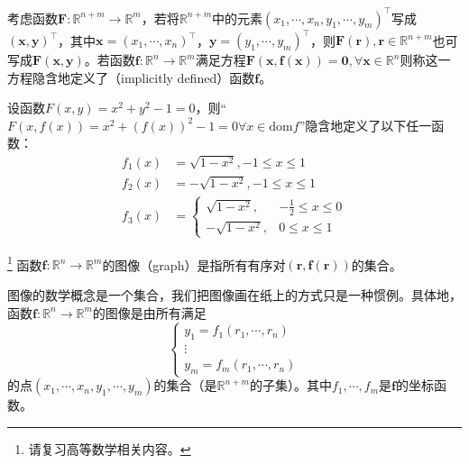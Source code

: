 \documentclass[main.tex]{subfiles}
\begin{document}
\begin{definition}[隐函数]
考虑函数$\mathbf{F}:\mathbb{R}^{n+m}\rightarrow\mathbb{R}^m$，若将$\mathbb{R}^{n+m}$中的元素$\left(x_1,\cdots,x_n,y_1,\cdots,y_m\right)^\intercal$写成$\left(\mathbf{x},\mathbf{y}\right)^\intercal$，其中$\mathbf{x}=\left(x_1,\cdots,x_n\right)^\intercal$，$\mathbf{y}=\left(y_1,\cdots,y_m\right)^\intercal$，则$\mathbf{F}\left(\mathbf{r}\right),\mathbf{r}\in\mathbb{R}^{n+m}$也可写成$\mathbf{F}\left(\mathbf{x},\mathbf{y}\right)$。若函数$\mathbf{f}:\mathbb{R}^n\rightarrow\mathbb{R}^m$满足方程$\mathbf{F}\left(\mathbf{x},\mathbf{f}\left(\mathbf{x}\right)\right)=\mathbf{0},\forall\mathbf{x}\in\mathbb{R}^n$则称这一方程隐含地定义了（implicitly defined）函数$\mathbf{f}$。
\end{definition}

\begin{example}
设函数$F\left(x,y\right)=x^2+y^2-1=0$，则“$F\left(x,f\left(x\right)\right)=x^2+\left(f\left(x\right)\right)^2-1=0\forall x\in\mathrm{dom}f$”隐含地定义了以下任一函数：
\begin{align*}
    f_1\left(x\right)&=\sqrt{1-x^2},-1\leq x\leq 1\\
    f_2\left(x\right)&=-\sqrt{1-x^2},-1\leq x\leq 1\\
    f_3\left(x\right)&=\left\{\begin{array}{ll}
    \sqrt{1-x^2},&-\frac{1}{2}\leq x\leq 0\\
    -\sqrt{1-x^2},&0\leq x\leq 1
    \end{array}\right.
\end{align*}
\end{example}

\begin{definition}[函数的图像]\footnote{请复习高等数学相关内容\cite[\S 6.4~6.7]{华工高数2009上}。}
函数$\mathbf{f}:\mathbb{R}^n\rightarrow\mathbb{R}^m$的图像（graph）是指所有有序对$\left(\mathbf{r},\mathbf{f}\left(\mathbf{r}\right)\right)$的集合。
\end{definition}

图像的数学概念是一个集合，我们把图像画在纸上的方式只是一种惯例。具体地，函数$\mathbf{f}:\mathbb{R}^n\rightarrow\mathbb{R}^m$的图像是由所有满足
\[
\left\{\begin{array}{c}y_1=f_1\left(r_1,\cdots,r_n\right)\\\vdots\\y_m=f_m\left(r_1,\cdots,r_n\right)\end{array}\right.
\]
的点$\left(x_1,\cdots,x_n,y_1,\cdots,y_m\right)$的集合（是$\mathbb{R}^{n+m}$的子集）。其中$f_1,\cdots,f_m$是$\mathbf{f}$的坐标函数。
\end{document}

